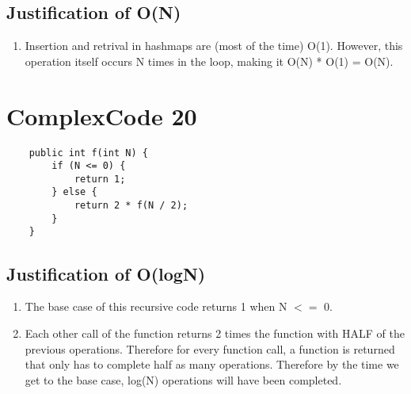 \documentclass[11pt]{article}
\begin{document}
\subsection{Justification of O(N)}
\begin{enumerate}
  \item Insertion and retrival in hashmaps are (most of the time) O(1). However, this 
  operation itself occurs N times in the loop, making it O(N) * O(1) = O(N).
\end{enumerate}

\section{ComplexCode 20}
\begin{lstlisting}
  	public int f(int N) {
		if (N <= 0) {
			return 1;
		} else {
			return 2 * f(N / 2);
		}
	}
\end{lstlisting}
\subsection{Justification of O(logN)}
\begin{enumerate}
  \item The base case of this recursive code returns 1 when N $<=$ 0.
  \item Each other call of the function returns 2 times the function with HALF of the 
  previous operations. Therefore for every function call, a function is returned 
  that only has to complete half as many operations. Therefore by the time we 
  get to the base case, log(N) operations will have been completed. 
\end{enumerate}
\end{document}
